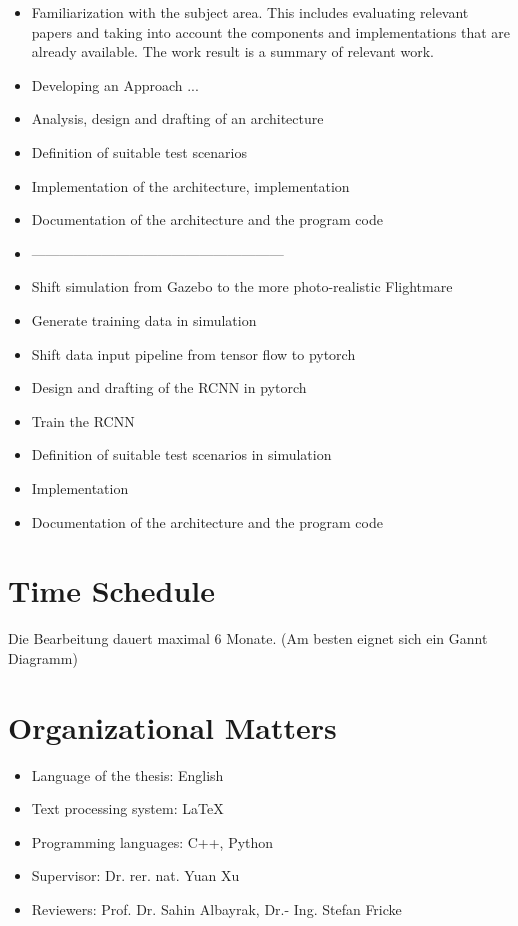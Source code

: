 \begin{itemize}
	\item Familiarization with the subject area. 
	This includes evaluating relevant papers and 
	taking into account the components and implementations 
	that are already available. 
	The work result is a summary of relevant work.

	\item Developing an Approach ...

	\item Analysis, design and drafting of an architecture

	\item Definition of suitable test scenarios

	\item Implementation of the architecture, implementation

	\item Documentation of the architecture and the program code
	
	\item ------------------------------------------------------
	\item Shift simulation from Gazebo to the more photo-realistic Flightmare
	\item Generate training data in simulation
	\item Shift data input pipeline from tensor flow to pytorch
	\item Design and drafting of the RCNN in pytorch
	\item Train the RCNN
	\item Definition of suitable test scenarios in simulation
	\item Implementation
	\item Documentation of the architecture and the program code

\end{itemize}

	
\chapter{Time Schedule}
Die Bearbeitung dauert maximal 6 Monate. (Am besten eignet sich ein Gannt Diagramm)

\chapter{Organizational Matters}
\begin{itemize}
	\item Language of the thesis: English
	\item Text processing system: LaTeX
	\item Programming languages: C++, Python
	\item Supervisor: Dr. rer. nat. Yuan Xu
	\item Reviewers: Prof. Dr. Sahin Albayrak, Dr.- Ing. Stefan Fricke
\end{itemize}

